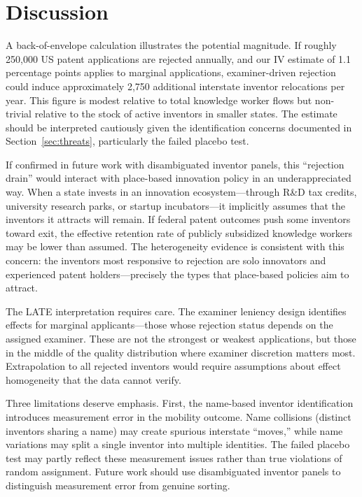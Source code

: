 \documentclass[12pt]{article}
\begin{document}



\section{Discussion}
\label{sec:discussion}

A back-of-envelope calculation illustrates the potential magnitude. If roughly 250,000 US patent applications are rejected annually, and our IV estimate of 1.1 percentage points applies to marginal applications, examiner-driven rejection could induce approximately 2,750 additional interstate inventor relocations per year. This figure is modest relative to total knowledge worker flows but non-trivial relative to the stock of active inventors in smaller states. The estimate should be interpreted cautiously given the identification concerns documented in Section~\ref{sec:threats}, particularly the failed placebo test.

If confirmed in future work with disambiguated inventor panels, this ``rejection drain'' would interact with place-based innovation policy in an underappreciated way. When a state invests in an innovation ecosystem---through R\&D tax credits, university research parks, or startup incubators---it implicitly assumes that the inventors it attracts will remain. If federal patent outcomes push some inventors toward exit, the effective retention rate of publicly subsidized knowledge workers may be lower than assumed. The heterogeneity evidence is consistent with this concern: the inventors most responsive to rejection are solo innovators and experienced patent holders---precisely the types that place-based policies aim to attract.

The LATE interpretation requires care. The examiner leniency design identifies effects for marginal applicants---those whose rejection status depends on the assigned examiner. These are not the strongest or weakest applications, but those in the middle of the quality distribution where examiner discretion matters most. Extrapolation to all rejected inventors would require assumptions about effect homogeneity that the data cannot verify.

Three limitations deserve emphasis. First, the name-based inventor identification introduces measurement error in the mobility outcome. Name collisions (distinct inventors sharing a name) may create spurious interstate ``moves,'' while name variations may split a single inventor into multiple identities. The failed placebo test may partly reflect these measurement issues rather than true violations of random assignment. Future work should use disambiguated inventor panels \citep{trajtenberg2006} to distinguish measurement error from genuine sorting.
\end{document}
